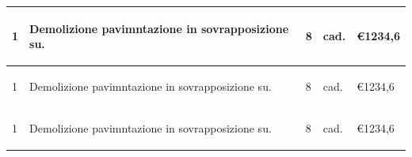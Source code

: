 \documentclass[a4paper]{article}
\begin{document}
\begin{tabular}{ | L{10mm} |  L{86mm} | L{12mm} | L{12mm} | L{16mm} | }
  \vspace{2.5mm}
  \begin{spacing}{0}
    1
  \end{spacing} &
  \vspace{2.5mm}
  \begin{spacing}{0}
  Demolizione pavimntazione in sovrapposizione su.
  \end{spacing} &
  \vspace{2.5mm}
  \begin{spacing}{0}
    8
  \end{spacing} &
  \vspace{2.5mm}
  \begin{spacing}{0}
    cad.
  \end{spacing} &
  \vspace{2.5mm}
  \begin{spacing}{0}
    \euro\hfill 1234,6
  \end{spacing} \\
  \hline

  \vspace{2.5mm}
  \begin{spacing}{0}
    1
  \end{spacing} &
  \vspace{2.5mm}
  \begin{spacing}{0}
  Demolizione pavimntazione in sovrapposizione su.
  \end{spacing} &
  \vspace{2.5mm}
  \begin{spacing}{0}
    8
  \end{spacing} &
  \vspace{2.5mm}
  \begin{spacing}{0}
    cad.
  \end{spacing} &
  \vspace{2.5mm}
  \begin{spacing}{0}
    \euro\hfill 1234,6
  \end{spacing} \\
  \hline

  \vspace{2.5mm}
  \begin{spacing}{0}
    1
  \end{spacing} &
  \vspace{2.5mm}
  \begin{spacing}{0}
  Demolizione pavimntazione in sovrapposizione su.
  \end{spacing} &
  \vspace{2.5mm}
  \begin{spacing}{0}
    8
  \end{spacing} &
  \vspace{2.5mm}
  \begin{spacing}{0}
    cad.
  \end{spacing} &
  \vspace{2.5mm}
  \begin{spacing}{0}
    \euro\hfill 1234,6
  \end{spacing} \\
  \hline




\end{tabular}
\end{document}
